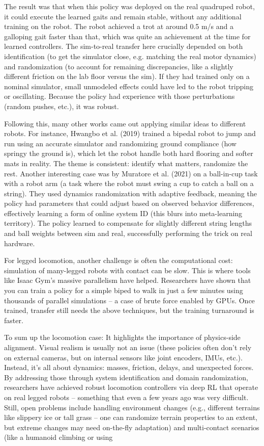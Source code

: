 The result was that when this policy was deployed on the real quadruped robot, it could execute the learned gaits and remain stable, without any additional training on the robot. The robot achieved a trot at around 0.5 m/s and a galloping gait faster than that, which was quite an achievement at the time for learned controllers. The sim-to-real transfer here crucially depended on both identification (to get the simulator close, e.g. matching the real motor dynamics) and randomization (to account for remaining discrepancies, like a slightly different friction on the lab floor versus the sim). If they had trained only on a nominal simulator, small unmodeled effects could have led to the robot tripping or oscillating. Because the policy had experience with those perturbations (random pushes, etc.), it was robust.

Following this, many other works came out applying similar ideas to different robots. For instance, Hwangbo et al. (2019) trained a bipedal robot to jump and run using an accurate simulator and randomizing ground compliance (how springy the ground is), which let the robot handle both hard flooring and softer mats in reality. The theme is consistent: identify what matters, randomize the rest. Another interesting case was by Muratore et al. (2021) on a ball-in-cup task with a robot arm (a task where the robot must swing a cup to catch a ball on a string). They used dynamics randomization with adaptive feedback, meaning the policy had parameters that could adjust based on observed behavior differences, effectively learning a form of online system ID (this blurs into meta-learning territory). The policy learned to compensate for slightly different string lengths and ball weights between sim and real, successfully performing the trick on real hardware.

For legged locomotion, another challenge is often the computational cost: simulation of many-legged robots with contact can be slow. This is where tools like Isaac Gym’s massive parallelism have helped. Researchers have shown that you can train a policy for a simple biped to walk in just a few minutes using thousands of parallel simulations – a case of brute force enabled by GPUs. Once trained, transfer still needs the above techniques, but the training turnaround is faster.

To sum up the locomotion case: It highlights the importance of physics-side alignment. Visual realism is usually not an issue (these policies often don’t rely on external cameras, but on internal sensors like joint encoders, IMUs, etc.). Instead, it’s all about dynamics: masses, friction, delays, and unexpected forces. By addressing those through system identification and domain randomization, researchers have achieved robust locomotion controllers via deep RL that operate on real legged robots – something that even a few years ago was very difficult. Still, open problems include handling environment changes (e.g., different terrains like slippery ice or tall grass – one can randomize terrain properties to an extent, but extreme changes may need on-the-fly adaptation) and multi-contact scenarios (like a humanoid climbing or using

